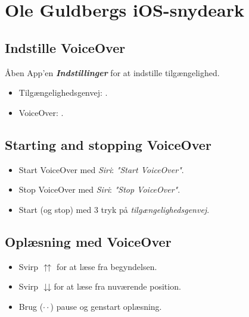 \documentclass[a4paper, landscape, 10pt]{scrartcl}
\begin{document}
\thispagestyle{empty}

\section*{Ole Guldbergs \faApple iOS-snydeark \faUniversalAccess}

\hrulefill{}
\begin{multicols}{2}

\subsection*{Indstille VoiceOver}
Åben App'en \textbf{\textit{Indstillinger \faCogs}} for at indstille tilgængelighed.
\begin{itemize}
  \item {Tilgængelighedsgenvej: .}
  \item {VoiceOver: .}
\end{itemize}

\subsection*{Starting and stopping VoiceOver}
\begin{itemize}
  \item{Start VoiceOver med \emph{Siri}: \textit{"Start VoiceOver"}.}
  \item{Stop VoiceOver med \emph{Siri}: \textit{"Stop VoiceOver"}.}
  \item {Start (og stop) med 3 tryk på \emph{tilgængelighedsgenvej}.}
\end{itemize}

\subsection*{Oplæsning med VoiceOver}
\begin{itemize}
  \item{Svirp $\upuparrows$ for at læse fra begyndelsen.}
  \item{Svirp $\downdownarrows$for at læse fra nuværende position.}
  \item{Brug ($\cdot\cdot$) pause og genstart oplæsning.}
\end{itemize}


\end{multicols}
\end{document}
